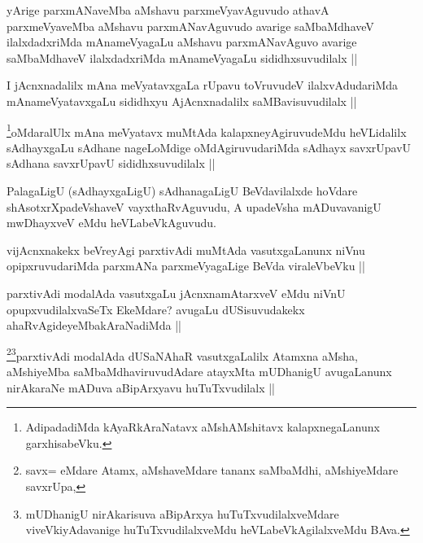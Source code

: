 \begin{artha}
yArige parxmANaveMba aMshavu parxmeVyavAguvudo athavA parxmeVyaveMba aMshavu parxmANavAguvudo avarige saMbaMdhaveV ilalxdadxriMda mAnameVyagaLu aMshavu parxmANavAguvo avarige saMbaMdhaveV ilalxdadxriMda mAnameVyagaLu sididhxsuvudilalx ||
\end{artha}

\begin{artha}
I jAcnxnadalilx mAna meVyatavxgaLa rUpavu toVruvudeV ilalxvAdudariMda mAnameVyatavxgaLu sididhxyu AjAcnxnadalilx saMBavisuvudilalx ||
\end{artha}

\begin{artha}
\footnote{AdipadadiMda kAyaRkAraNatavx aMshAMshitavx kalapxnegaLanunx garxhisabeVku.}oMdaralUlx mAna meVyatavx muMtAda kalapxneyAgiruvudeMdu heVLidalilx sAdhayxgaLu sAdhane nageLoMdige oMdAgiruvudariMda sAdhayx savxrUpavU sAdhana savxrUpavU sididhxsuvudilalx ||
\end{artha}

\begin{artha}
PalagaLigU (sAdhayxgaLigU) sAdhanagaLigU BeVdavilalxde hoVdare shAsotxrXpadeVshaveV vayxthaRvAguvudu, A upadeVsha mADuvavanigU mwDhayxveV eMdu heVLabeVkAguvudu.
\end{artha}

\begin{artha}
vijAcnxnakekx beVreyAgi parxtivAdi muMtAda vasutxgaLanunx niVnu opipxruvudariMda parxmANa parxmeVyagaLige BeVda viraleVbeVku || 
\end{artha}

\begin{artha}
parxtivAdi modalAda vasutxgaLu jAcnxnamAtarxveV eMdu niVnU opupxvudilalxvaSeTx EkeMdare? avugaLu dUSisuvudakekx ahaRvAgideyeMbakAraNadiMda ||
\end{artha}

\begin{artha}
\footnote{savx= eMdare Atamx, aMshaveMdare tananx saMbaMdhi, aMshiyeMdare savxrUpa,}\footnote{mUDhanigU nirAkarisuva aBipArxya huTuTxvudilalxveMdare viveVkiyAdavanige huTuTxvudilalxveMdu heVLabeVkAgilalxveMdu BAva.}parxtivAdi modalAda dUSaNAhaR vasutxgaLalilx Atamxna aMsha, aMshiyeMba saMbaMdhaviruvudAdare atayxMta mUDhanigU avugaLanunx nirAkaraNe mADuva aBipArxyavu huTuTxvudilalx ||
\end{artha}

